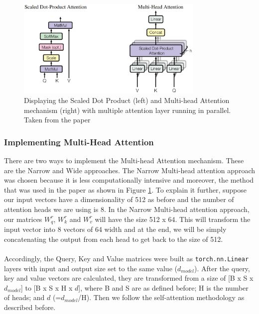 \documentclass[12pt,a4paper,twoside,openright]{report}
\begin{document}
\begin{figure}[H]
    \centering
    \includegraphics[width=0.8\textwidth]{figs/multihead-attention.PNG}
    \caption{Displaying the Scaled Dot Product (left) and Multi-head Attention mechanism (right) with multiple attention layer running in parallel. Taken from the paper\cite{transformers}}
    \label{fig:multi-head-attention}
\end{figure}


\subsubsection{Implementing Multi-Head Attention}

There are two ways to implement the Multi-head Attention mechanism. These are the Narrow and Wide approaches. The Narrow Multi-head attention approach was chosen because it is less computationally intensive and moreover, the method that was used in the paper\cite{transformers} as shown in Figure \ref{fig:multi-head-attention}. To explain it further, suppose our input vectors have a dimensionality of 512 as before and the number of attention heads we are using is 8. In the Narrow Multi-head attention approach, our matrices $W^r_q$, $W^r_k$ and $W^r_v$ will have the size 512 x 64. This will transform the input vector into 8 vectors of 64 width and at the end, we will be simply concatenating the output from each head to get back to the size of 512.
\\\\
Accordingly, the Query, Key and Value matrices were built as \lstinline{torch.nn.Linear} layers with input and output size set to the same value ($d_{model}$). After the query, key and value vectors are calculated, they are transformed from a size of [B x S x $d_{model}$] to [B x S x H x $d$], where B and S are as defined before; H is the number of heads; and $d$ (=$d_{model}$/H). Then we follow the self-attention methodology as described before.
\end{document}
